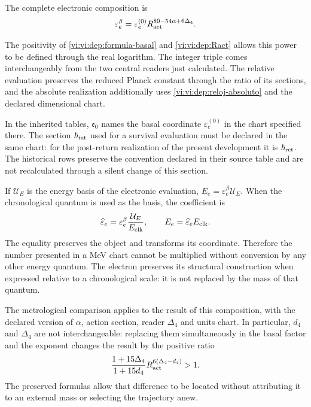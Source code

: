 \begin{definition}
The complete electronic composition is
\begin{equation}
 \varepsilon_e^\beta
  =\varepsilon_e^{(0)}
      R_{\rm act}^{80-54\alpha+6\Delta_4}.
 \label{vi:vi:dep:electron-beta}
\end{equation}
\end{definition}
The positivity of \eqref{vi:vi:dep:formula-basal} and
\eqref{vi:vi:dep:Ract} allows this power to be defined through the
real logarithm. The integer triple comes interchangeably from the two
central readers just calculated. The relative evaluation
preserves the reduced Planck constant through the ratio of its
sections, and the absolute realization additionally uses
\eqref{vi:vi:dep:reloj-absoluto} and the declared dimensional chart.

In the inherited tables, \(\mathfrak e_0\) names the
basal coordinate \(\varepsilon_e^{(0)}\) in the chart specified
there. The section \(\hbar_{\rm int}\) used for a
survival evaluation must be declared in the same chart:
for the post-return realization of the present development
it is \(\hbar_{\rm ret}\). The historical rows preserve the
convention declared in their source table and are not recalculated through a
silent change of this section.

If \(\mathcal U_E\) is the energy basis of the electronic
evaluation, \(E_e=\varepsilon_e^\beta\mathcal U_E\). When
the chronological quantum is used as the basis, the coefficient is
\[
 \widehat\varepsilon_e
   =\varepsilon_e^\beta\frac{\mathcal U_E}{E_{\rm clk}},
 \qquad E_e=\widehat\varepsilon_e E_{\rm clk}.
\]
The equality preserves the object and transforms its coordinate. Therefore
the number presented in a MeV chart cannot be multiplied
without conversion by any other energy quantum. The electron
preserves its structural construction when expressed relative to a
chronological scale: it is not replaced by the mass of that quantum.

The metrological comparison applies to the result of this composition,
with the declared version of \(\alpha\), action section, reader
\(\Delta_4\) and units chart. In particular,
\(d_4\) and \(\Delta_4\) are not interchangeable: replacing them
simultaneously in the basal factor and the exponent changes the
result by the positive ratio
\[
 \frac{1+15\Delta_4}{1+15d_4}
 R_{\rm act}^{6(\Delta_4-d_4)}>1.
\]
The preserved formulas allow that difference to be located without
attributing it to an external mass or selecting the trajectory anew.

